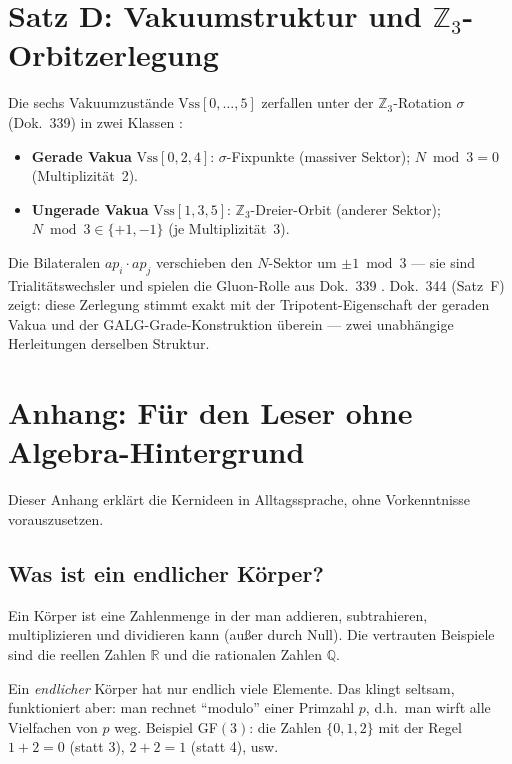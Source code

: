 \section{Satz D: Vakuumstruktur und $\mathbb{Z}_3$-Orbitzerlegung}

Die sechs Vakuumzustände $\mathrm{Vss}[0,\ldots,5]$ zerfallen unter der
$\mathbb{Z}_3$-Rotation $\sigma$ (Dok.~339) in zwei Klassen \BM:

\begin{itemize}
\item \textbf{Gerade Vakua} $\mathrm{Vss}[0,2,4]$: $\sigma$-Fixpunkte
      (massiver Sektor); $N \bmod 3 = 0$ (Multiplizität~2).
\item \textbf{Ungerade Vakua} $\mathrm{Vss}[1,3,5]$: $\mathbb{Z}_3$-Dreier-Orbit
      (anderer Sektor); $N \bmod 3 \in \{+1,-1\}$ (je Multiplizität~3).
\end{itemize}

Die Bilateralen $ap_i \cdot ap_j$ verschieben den $N$-Sektor um
$\pm 1 \bmod 3$ --- sie sind Trialitätswechsler und spielen die Gluon-Rolle aus
Dok.~339 \BM. Dok.~344 (Satz~F) zeigt: diese Zerlegung stimmt exakt mit der
Tripotent-Eigenschaft der geraden Vakua und der GALG-Grade-Konstruktion überein ---
zwei unabhängige Herleitungen derselben Struktur.


\section*{Anhang: Für den Leser ohne Algebra-Hintergrund}

Dieser Anhang erklärt die Kernideen in Alltagssprache, ohne Vorkenntnisse vorauszusetzen.

\subsection*{Was ist ein endlicher Körper?}

Ein Körper ist eine Zahlenmenge in der man addieren, subtrahieren, multiplizieren und
dividieren kann (außer durch Null). Die vertrauten Beispiele sind die reellen Zahlen
$\mathbb{R}$ und die rationalen Zahlen $\mathbb{Q}$.

Ein \emph{endlicher} Körper hat nur endlich viele Elemente.
Das klingt seltsam, funktioniert aber: man rechnet ``modulo'' einer Primzahl $p$,
d.h.\ man wirft alle Vielfachen von $p$ weg.
Beispiel GF$(3)$: die Zahlen $\{0, 1, 2\}$ mit der Regel $1+2 = 0$ (statt 3),
$2+2 = 1$ (statt 4), usw.

